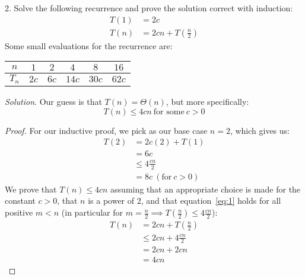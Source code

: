 \documentclass{scrartcl}
\begin{document}
\begin{flushleft}
    2. Solve the following recurrence and prove the solution correct with induction:
    \begin{align*}
        T(1) &= 2c\\
        T(n) &= 2cn + T(\frac{n}{2})
    \end{align*}
    Some small evaluations for the recurrence are:
    \medskip
    \begin{center}
        \begin{tabular}{|c|c|c|c|c|c|}
            \hline
            $n$ & $1$ & $2$ & $4$ & $8$ & $16$\\
            \hline
            $T_n$ & $2c$ & $6c$ & $14c$ & $30c$ & $62c$\\
            \hline
        \end{tabular}
    \end{center}
    \medskip
    \textit{Solution}. Our guess is that $T(n) = \Theta(n)$, but more specifically:
    \begin{equation}
        T(n) \leq 4cn\ \text{for some}\ c > 0
        \label{eq:1}
    \end{equation}
    \begin{proof}
        For our inductive proof, we pick as our base case $n = 2$, which gives us:
        \begin{align*}
            T(2) &= 2c(2) + T(1)\\
            &= 6c\\
            &\leq 4\frac{cn}{2}\\
            &= 8c\ (\text{for}\ c > 0)
        \end{align*}
        We prove that $T(n) \leq 4cn$ assuming that an appropriate choice is made for the constant
        $c > 0$, that $n$ is a power of $2$, and that equation~\ref{eq:1} holds for all positive $m
        < n$ (in particular for $m = \frac{n}{2} \implies T(\frac{n}{2}) \leq 4\frac{cn}{2}$):
        \begin{align*}
            T(n) &= 2cn + T(\frac{n}{2})\\
            &\leq 2cn + 4\frac{cn}{2}\\
            &= 2cn + 2cn\\
            &= 4cn
        \end{align*}
    \end{proof}

\end{flushleft}
\end{document}
